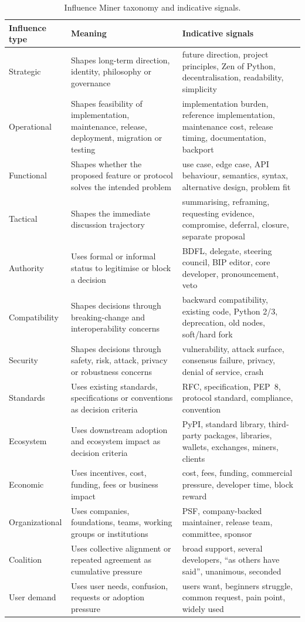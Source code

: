 \documentclass[sigconf,screen]{acmart}
\begin{document}
\begin{table}
\caption{Influence Miner taxonomy and indicative signals.}
\label{tab:taxonomy}
\begin{tabular}{p{}p{}p{}}
\toprule
\textbf{Influence type} & \textbf{Meaning} & \textbf{Indicative signals} \\
\midrule
Strategic & Shapes long-term direction, identity, philosophy or governance & future direction, project principles, Zen of Python, decentralisation, readability, simplicity \\
Operational & Shapes feasibility of implementation, maintenance, release, deployment, migration or testing & implementation burden, reference implementation, maintenance cost, release timing, documentation, backport \\
Functional & Shapes whether the proposed feature or protocol solves the intended problem & use case, edge case, API behaviour, semantics, syntax, alternative design, problem fit \\
Tactical & Shapes the immediate discussion trajectory & summarising, reframing, requesting evidence, compromise, deferral, closure, separate proposal \\
Authority & Uses formal or informal status to legitimise or block a decision & BDFL, delegate, steering council, BIP editor, core developer, pronouncement, veto \\
Compatibility & Shapes decisions through breaking-change and interoperability concerns & backward compatibility, existing code, Python 2/3, deprecation, old nodes, soft/hard fork \\
Security & Shapes decisions through safety, risk, attack, privacy or robustness concerns & vulnerability, attack surface, consensus failure, privacy, denial of service, crash \\
Standards & Uses existing standards, specifications or conventions as decision criteria & RFC, specification, PEP~8, protocol standard, compliance, convention \\
Ecosystem & Uses downstream adoption and ecosystem impact as decision criteria & PyPI, standard library, third-party packages, libraries, wallets, exchanges, miners, clients \\
Economic & Uses incentives, cost, funding, fees or business impact & cost, fees, funding, commercial pressure, developer time, block reward \\
Organizational & Uses companies, foundations, teams, working groups or institutions & PSF, company-backed maintainer, release team, committee, sponsor \\
Coalition & Uses collective alignment or repeated agreement as cumulative pressure & broad support, several developers, ``as others have said'', unanimous, seconded \\
User demand & Uses user needs, confusion, requests or adoption pressure & users want, beginners struggle, common request, pain point, widely used \\
\bottomrule
\end{tabular}
\end{table}
\end{document}
